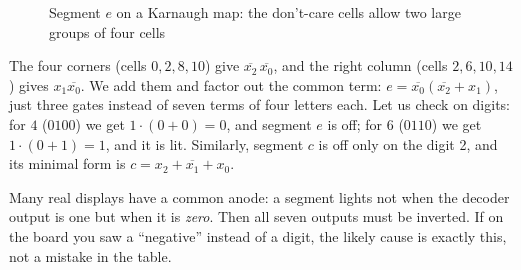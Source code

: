 \begin{figure}[H]
\centering
{}
\caption{Segment $e$ on a Karnaugh map: the don't-care cells allow two large groups of four cells}
\label{fig:seg_e}
\end{figure}

The four corners (cells $0,2,8,10$) give $\overline{x_2}\,\overline{x_0}$,
and the right column (cells $2,6,10,14$) gives $x_1\overline{x_0}$. We add them and
factor out the common term: $e=\overline{x_0}(\overline{x_2}+x_1)$, just three
gates instead of seven terms of four letters each. Let us check on digits:
for $4$ ($0100$) we get $1\cdot(0+0)=0$, and segment $e$ is off; for $6$
($0110$) we get $1\cdot(0+1)=1$, and it is lit. Similarly, segment $c$ is off only
on the digit 2, and its minimal form is $c=x_2+\overline{x_1}+x_0$.

\begin{warnbox}
Many real displays have a common anode: a segment lights not when the
decoder output is one but when it is \emph{zero}. Then all seven outputs must be
inverted. If on the board you saw a ``negative'' instead of a digit, the likely
cause is exactly this, not a mistake in the table.
\end{warnbox}

